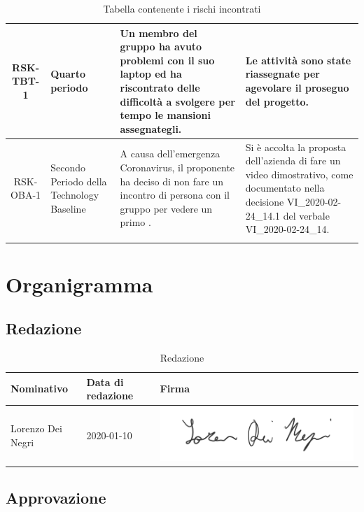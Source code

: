 \begin{center}
\begin{longtable}{|c|p{3cm}|p{4cm}|p{4cm}|}
			\hline
			RSK-TBT-1 & Quarto periodo & Un membro del gruppo ha avuto problemi con il suo laptop ed ha riscontrato delle difficoltà a svolgere per tempo le mansioni assegnategli. & Le attività sono state riassegnate per agevolare il proseguo del progetto. \\
			\hline
			RSK-OBA-1 & Secondo Periodo della Technology Baseline & A causa dell'emergenza Coronavirus, il proponente ha deciso di non fare un incontro di persona con il gruppo per vedere un primo \glock{poc}. & Si è accolta la proposta dell'azienda di fare un video dimostrativo, come documentato nella decisione VI_2020-02-24_14.1 del verbale VI_2020-02-24_14. \\
			\hline
			\caption{Tabella contenente i rischi incontrati}
			\end{longtable}
		\end{center}

	\section{Organigramma}
		
		\subsection{Redazione}
			
			\begin{table}[!h]
				\centering
					\begin{tabular}{|l|l|l|}
						\hline
						\textbf{Nominativo} & \textbf{Data di redazione} & \textbf{Firma} \\ \hline
						Lorenzo Dei Negri & 2020-01-10 &  \includegraphics[scale=0.6]{images/firme/lorenzo} \\ \hline
					\end{tabular}
				\caption{Redazione}
			\end{table}
		
		\subsection{Approvazione}
			
